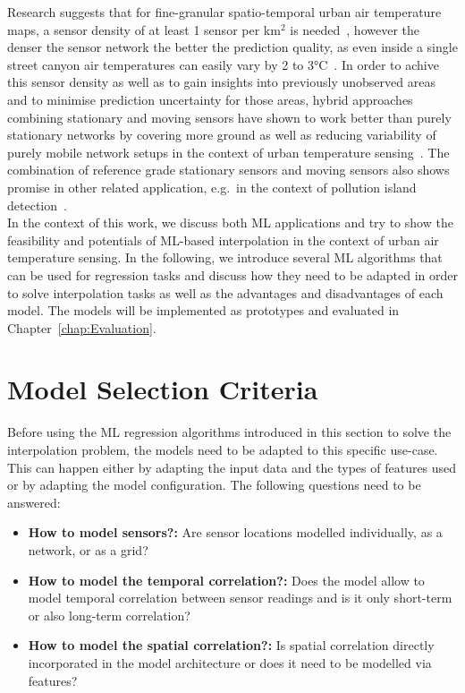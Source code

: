 Research suggests that for fine-granular spatio-temporal urban air temperature maps, a sensor density of at least 1 sensor per km$^{2}$ is needed~\cite{venter2020hyperlocal}, however the denser the sensor network the better the prediction quality, as even inside a single street canyon air temperatures can easily vary by 2 to 3°C~\cite{sugawara2008temperature}.
In order to achive this sensor density as well as to gain insights into previously unobserved areas and to minimise prediction uncertainty for those areas, hybrid approaches combining stationary and moving sensors have shown to work better than purely stationary networks by covering more ground as well as reducing variability of purely mobile network setups in the context of urban temperature sensing~\cite{yang2019designing}. The combination of reference grade stationary sensors and moving sensors also shows promise in other related application, e.g.\ in the context of pollution island detection~\cite{iyer2022modeling}.\\
In the context of this work, we discuss both ML applications and try to show the feasibility and potentials of ML-based interpolation in the context of urban air temperature sensing.
In the following, we introduce several ML algorithms that can be used for regression tasks and discuss how they need to be adapted in order to solve interpolation tasks as well as the advantages and disadvantages of each model. The models will be implemented as prototypes and evaluated in Chapter~\ref{chap:Evaluation}.

\section{Model Selection Criteria}
\label{sec: model selection criteria}

Before using the ML regression algorithms introduced in this section to solve the interpolation problem, the models need to be adapted to this specific use-case. This can happen either by adapting the input data and the types of features used or by adapting the model configuration. The following questions need to be answered:

\begin{itemize}
    \item \textbf{How to model sensors?:} Are sensor locations modelled individually, as a network, or as a grid?
    \item \textbf{How to model the temporal correlation?:} Does the model allow to model temporal correlation between sensor readings and is it only short-term or also long-term correlation?
    \item \textbf{How to model the spatial correlation?:} Is spatial correlation directly incorporated in the model architecture or does it need to be modelled via features?
\end{itemize}

